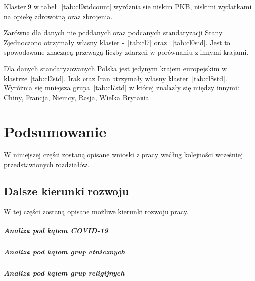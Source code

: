 \documentclass[11pt]{report}
\begin{document}
    Klaster 9 w tabeli~\ref{tab:cl9stdcount} wyróżnia sie niskim PKB, niskimi wydatkami na opiekę zdrowotną oraz zbrojenia.

    


    Zarówno dla danych nie poddanych oraz poddanych standaryzacji Stany Zjednoczono otrzymały własny klaster -~\ref{tab:cl7} oraz ~\ref{tab:cl0std}.
    Jest to spowodowane znaczącą przewagą liczby zdarzeń w porównaniu z innymi krajami.

    Dla danych standaryzowanych Polska jest jedynym krajem europejskim w klastrze~\ref{tab:cl2std}.
    Irak oraz Iran otrzymały własny klaster~\ref{tab:cl8std}.
    Wyróżnia się mniejsza grupa~\ref{tab:cl7std} w której znalazły się między innymi: Chiny, Francja, Niemcy, Rosja, Wielka Brytania.


    \chapter{Podsumowanie}
    W niniejszej części zostaną opisane wnioski z pracy według kolejności wcześniej przedstawionych rozdziałów.


    \section{Dalsze kierunki rozwoju}
    W tej części zostaną opisane możliwe kierunki rozwoju pracy.

    \paragraph{Analiza pod kątem COVID-19}

    \paragraph{Analiza pod kątem grup etnicznych}

    \paragraph{Analiza pod kątem grup religijnych}



    \newpage
    \printbibliography[title={Bibliografia}]
\end{document}
